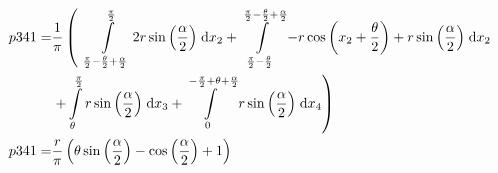 \begin{align}
    p341 =&\frac{1}{\pi} \left(\;\;\int\limits_{\frac{\pi}{2} - \frac{\theta}{2} + \frac{\alpha}{2}}^{\frac{\pi}{2}}2 r \sin{\left (\frac{\alpha}{2} \right )}\;\mathrm{d}x_{2}+\int\limits_{\frac{\pi}{2} - \frac{\theta}{2}}^{\frac{\pi}{2} - \frac{\theta}{2} + \frac{\alpha}{2}}- r \cos{\left (x_{2} + \frac{\theta}{2} \right )} + r \sin{\left (\frac{\alpha}{2} \right )}\;\mathrm{d}x_{2}\right.\notag\\
 &\left.+\int\limits_{\theta}^{\frac{\pi}{2}}r \sin{\left (\frac{\alpha}{2} \right )}\;\mathrm{d}x_{3}+\int\limits_{0}^{- \frac{\pi}{2} + \theta + \frac{\alpha}{2}}r \sin{\left (\frac{\alpha}{2} \right )}\;\mathrm{d}x_{4}\right)\label{p341Def}\\
    p341 =& \frac{r}{\pi} \left(\theta \sin{\left (\frac{\alpha}{2} \right )} - \cos{\left (\frac{\alpha}{2} \right )} + 1\right)\label{p341Sln}
\end{align}